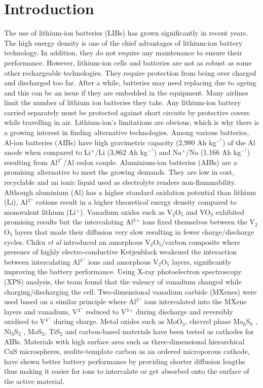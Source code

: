 \documentclass[num-refs]{wiley-article}
\begin{document}
\section{Introduction}
The use of lithium-ion batteries (LIBs) has grown significantly in recent years. The high energy density is one of the chief advantages of lithium-ion battery technology. In addition, they do not require any maintenance to ensure their performance. However, lithium-ion cells and batteries are not as robust as some other rechargeable technologies. They require protection from being over charged and discharged too far. After a while, batteries may need replacing due to ageing and this can be an issue if they are embedded in the equipment. Many airlines limit the number of lithium ion batteries they take. Any lithium-ion battery carried separately must be protected against short circuits by protective covers while travelling in air. Lithium-ion’s limitations are obvious, which is why there is a growing interest in finding alternative technologies. Among various batteries, Al-ion batteries (AIBs) have high gravimetric capacity (2,980 Ah kg$^-^1$) of the Al anode when compared to Li$^+$/Li (3,862 Ah kg$^-^1$) and Na$^+$/Na (1,166 Ah kg$^-^1$) resulting from Al$^3^+$/Al redox couple. Aluminium-ion batteries (AIBs) are a promising alternative to meet the growing demands. They are low in cost, recyclable and an ionic liquid used as electrolyte renders non-flammability. Although aluminium (Al) has a higher standard oxidation potential than lithium (Li), Al$^3^+$ cations result in a higher theoretical energy density compared to monovalent lithium (Li$^+$). Vanadium oxides such as V$_2$O$_5$ and VO$_2$ exhibited promising results but the intercalating Al$^3{^+}$ ions fixed themselves between the V$_2$O${_5}$ layers that made their diffusion very slow resulting in fewer charge/discharge cycles. Chiku \textit{et al} \cite{chiku_amorphous_2015} introduced an amorphous V$_2$O${_5}$/carbon composite where presence of highly electro-conductive Ketjenblack weakened the interaction between intercalating Al$^3^+$ ions and amorphous V$_2$O$_5$ layers, significantly improving the battery performance. Using X-ray photoelectron spectroscopy (XPS) analysis, the team found that the valency of vanadium changed while charging/discharging the cell. Two-dimensional vanadium carbide (MXenes)\cite{vahidmohammadi_two-dimensional_2017} were used based on a similar principle where Al$^3^+$ ions intercalated into the MXene layers and vanadium, V$^4^+$ reduced to V$^3{^+}$ during discharge and reversibly oxidised to V$^4^+$ during charge. Metal oxides such as MoO$_3$\cite{lahan_al3+_2019}, chevrel phase Mo$_6$S$_8$ \cite{geng_reversible_2015}, Ni$_3$S$_2$ \cite{wang_novel_2016}, MoS$_2$\cite{li_rechargeable_2018}, TiS$_2$\cite{geng_titanium_2017} and carbon-based materials have been tested as cathodes for AIBs. Materials with high surface area such as three-dimensional hierarchical CuS microspheres\cite{wang_high-performance_2017}, zeolite-template carbon\cite{stadie_zeolite-templated_2017} as an ordered microporous cathode, have shown better battery performance by providing shorter diffusion lengths thus making it easier for ions to intercalate or get absorbed onto the surface of the active material. 
\end{document}
